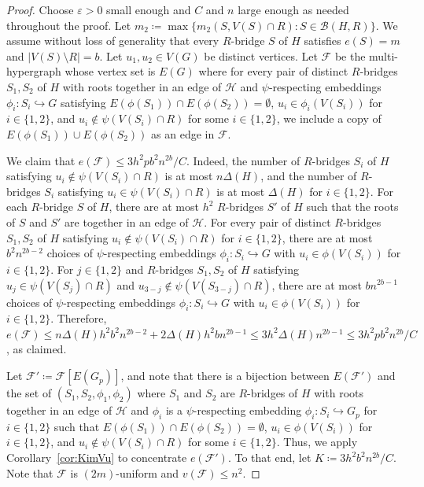 \documentclass[11pt]{article}
\numberwithin{equation}{section}
\newcounter{i}
\theoremstyle{plain}
\theoremstyle{plain} %
\theoremstyle{definition}
\newcommand{\cB}{\mathcal{B}}
\newcommand{\cF}{\mathcal{F}}
\newcommand{\cH}{\mathcal{H}}
\begin{document}
\begin{proof}
Choose $\varepsilon > 0$ small enough and $C$ and $n$ large enough as needed throughout the proof.  
Let $m_2 \coloneqq \max\{m_2(S, V(S) \cap R) : S \in \cB(H, R)\}$.
We assume without loss of generality that every $R$-bridge $S$ of $H$ satisfies $e(S) = m$ and $|V(S) \setminus R| = b$.
Let $u_1, u_2 \in V(G)$ be distinct vertices.
Let $\cF$ be the multi-hypergraph whose vertex set is $E(G)$ where for every pair of distinct $R$-bridges $S_1, S_2$ of $H$ with roots together in an edge of $\cH$ and $\psi$-respecting embeddings $\phi_i : S_i \hookrightarrow G$ satisfying $E(\phi(S_1)) \cap E(\phi(S_2)) = \emptyset$, $u_i \in \phi_i(V(S_i))$ for $i \in\{1,2\}$, and $u_i \notin \psi (V(S_i)\cap R)$ for some $i \in \{1,2\}$, we include a copy of $E(\phi(S_1)) \cup E(\phi(S_2))$ as an edge in $\cF$.

We claim that $e(\cF) \leq 3h^2pb^2n^{2b} / C$.
Indeed, the number of $R$-bridges $S_i$ of $H$ satisfying $u_i \notin \psi(V(S_i)\cap R)$ is at most $n\Delta(H)$, and the number of $R$-bridges $S_i$ satisfying $u_i \in \psi(V(S_i) \cap R)$ is at most $\Delta(H)$ for $i \in \{1,2\}$.  For each $R$-bridge $S$ of $H$, there are at most $h^2$ $R$-bridges $S'$ of $H$ such that the roots of $S$ and $S'$ are together in an edge of $\cH$.  
For every pair of distinct $R$-bridges $S_1, S_2$ of $H$ satisfying $u_i \notin \psi(V(S_i)\cap R)$ for $i \in \{1,2\}$, there are at most $b^2n^{2b-2}$ choices of $\psi$-respecting embeddings $\phi_i : S_i \hookrightarrow G$ with $u_i \in \phi(V(S_i))$ for $i \in \{1,2\}$.
For $j \in \{1,2\}$ and $R$-bridges $S_1, S_2$ of $H$ satisfying $u_j \in \psi(V(S_j) \cap R)$ and $u_{3-j} \notin \psi(V(S_{3-j}) \cap R)$, there are at most $bn^{2b-1}$ choices of $\psi$-respecting embeddings $\phi_i : S_i \hookrightarrow G$ with $u_i \in \phi(V(S_i))$ for $i \in \{1,2\}$.
Therefore, $e(\cF) \leq n\Delta(H)h^2b^2n^{2b-2} + 2\Delta(H)h^2bn^{2b-1} \leq 3h^2\Delta(H)n^{2b-1} \leq 3h^2pb^2n^{2b} / C$, as claimed.

Let $\cF' \coloneqq \cF[E(G_p)]$, and note that there is a bijection between $E(\cF')$ and the set of $(S_1, S_2, \phi_1, \phi_2)$ where $S_1$ and $S_2$ are $R$-bridges of $H$ with roots together in an edge of $\cH$ and $\phi_i$ is a $\psi$-respecting embedding $\phi_i : S_i \hookrightarrow G_p$ for $i \in \{1,2\}$ such that $E(\phi(S_1)) \cap E(\phi(S_2)) = \emptyset$, $u_i \in \phi(V(S_i))$ for $i \in \{1,2\}$, and $u_i \notin \psi(V(S_i) \cap R)$ for some $i \in \{1,2\}$. 
Thus, we apply Corollary~\ref{cor:KimVu} to concentrate $e(\cF')$.  
To that end, let $K \coloneqq 3h^2b^2n^{2b}/C$.
Note that $\cF$ is $(2m)$-uniform and $v(\cF) \leq n^2$.


\end{proof}
\end{document}

